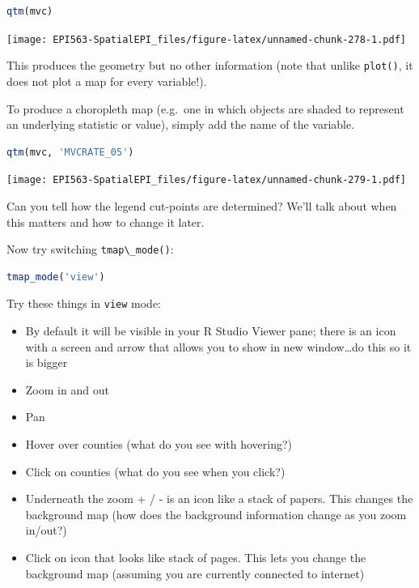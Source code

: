 \documentclass[
]{book}
\newcommand{\passthrough}[1]{#1}
\providecommand{\tightlist}{%
  \setlength{\itemsep}{0pt}\setlength{\parskip}{0pt}}
\begin{document}
\begin{lstlisting}[language=R]
qtm(mvc)
\end{lstlisting}

\texttt{[image: EPI563-SpatialEPI\_files/figure-latex/unnamed-chunk-278-1.pdf]}

This produces the geometry but no other information (note that unlike \passthrough{\lstinline!plot()!}, it does not plot a map for every variable!).

To produce a choropleth map (e.g.~one in which objects are shaded to represent an underlying statistic or value), simply add the name of the variable.

\begin{lstlisting}[language=R]
qtm(mvc, 'MVCRATE_05')
\end{lstlisting}

\texttt{[image: EPI563-SpatialEPI\_files/figure-latex/unnamed-chunk-279-1.pdf]}

Can you tell how the legend cut-points are determined? We'll talk about when this matters and how to change it later.

Now try switching \passthrough{\lstinline!tmap\_mode()!}:

\begin{lstlisting}[language=R]
tmap_mode('view')
\end{lstlisting}

Try these things in \passthrough{\lstinline!view!} mode:

\begin{itemize}
\tightlist
\item
  By default it will be visible in your R Studio Viewer pane; there is an icon with a screen and arrow that allows you to show in new window\ldots do this so it is bigger
\item
  Zoom in and out
\item
  Pan
\item
  Hover over counties (what do you see with hovering?)
\item
  Click on counties (what do you see when you click?)
\item
  Underneath the zoom + / - is an icon like a stack of papers. This changes the background map (how does the background information change as you zoom in/out?)
\item
  Click on icon that looks like stack of pages. This lets you change the background map (assuming you are currently connected to internet)
\end{itemize}
\end{document}
